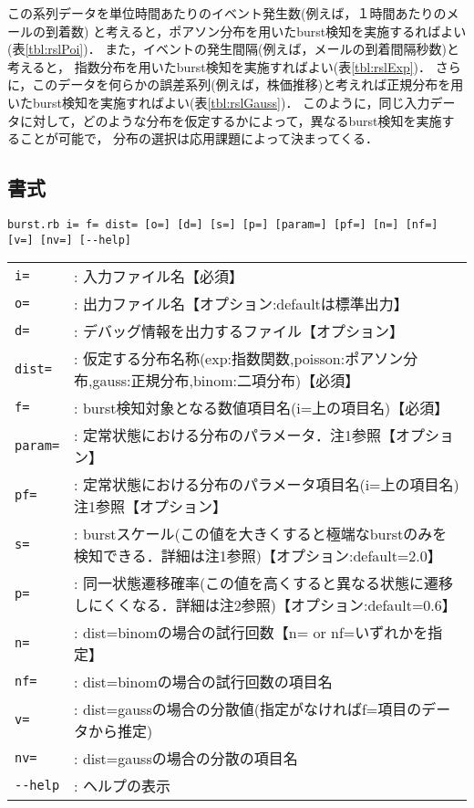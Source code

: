 \begin{table}[htbp]
\begin{center}
\begin{tabular}{llll}
\end{tabular} 
\end{center}
\end{table} 

この系列データを単位時間あたりのイベント発生数(例えば，１時間あたりのメールの到着数)
と考えると，ポアソン分布を用いたburst検知を実施するればよい(表\ref{tbl:rslPoi})．
また，イベントの発生間隔(例えば，メールの到着間隔秒数)と考えると，
指数分布を用いたburst検知を実施すればよい(表\ref{tbl:rslExp})．
さらに，このデータを何らかの誤差系列(例えば，株価推移)と考えれば正規分布を用いたburst検知を実施すればよい(表\ref{tbl:rslGauss})．
このように，同じ入力データに対して，どのような分布を仮定するかによって，異なるburst検知を実施することが可能で，
分布の選択は応用課題によって決まってくる．


\subsection{書式}
\begin{verbatim}
burst.rb i= f= dist= [o=] [d=] [s=] [p=] [param=] [pf=] [n=] [nf=] [v=] [nv=] [--help]
\end{verbatim}

\begin{table}[htbp]
{\small
\begin{tabular}{ll}
\verb|i=|     & : 入力ファイル名【必須】 \\
\verb|o=|     & : 出力ファイル名【オプション:defaultは標準出力】 \\
\verb|d=|     & : デバッグ情報を出力するファイル【オプション】 \\
\verb|dist=|  & : 仮定する分布名称(exp:指数関数,poisson:ポアソン分布,gauss:正規分布,binom:二項分布)【必須】 \\
\verb|f=|     & : burst検知対象となる数値項目名(i=上の項目名)【必須】 \\
\verb|param=| & : 定常状態における分布のパラメータ．注1参照【オプション】 \\
\verb|pf=|    & : 定常状態における分布のパラメータ項目名(i=上の項目名)注1参照【オプション】 \\
\verb|s=|     & : burstスケール(この値を大きくすると極端なburstのみを検知できる．詳細は注1参照)【オプション:default=2.0】 \\
\verb|p=|     & : 同一状態遷移確率(この値を高くすると異なる状態に遷移しにくくなる．詳細は注2参照)【オプション:default=0.6】 \\
\verb|n=|     & : dist=binomの場合の試行回数【n= or nf=いずれかを指定】 \\
\verb|nf=|    & : dist=binomの場合の試行回数の項目名 \\
\verb|v=|     & : dist=gaussの場合の分散値(指定がなければf=項目のデータから推定) \\
\verb|nv=|    & : dist=gaussの場合の分散の項目名 \\
\verb|--help| & : ヘルプの表示 \\
\end{tabular} 
}
\end{table} 

